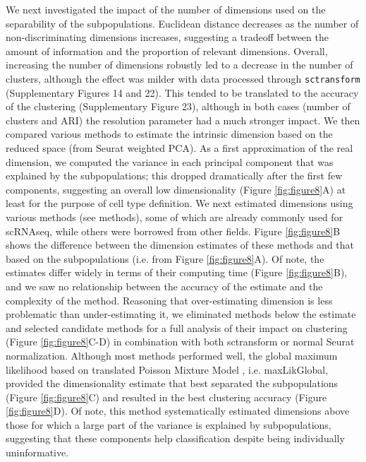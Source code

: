 \documentclass{bmcart}
\begin{document}
We next investigated the impact of the number of dimensions used on the separability of the subpopulations. Euclidean distance decreases as the number of non-discriminating dimensions increases, suggesting a tradeoff between the amount of information and the proportion of relevant dimensions. Overall, increasing the number of dimensions robustly led to a decrease in the number of clusters, although the effect was milder with data processed through \texttt{sctransform} (Supplementary Figures 14 and 22). This tended to be translated to the accuracy of the clustering (Supplementary Figure 23), although in both cases (number of clusters and ARI) the resolution parameter had a much stronger impact. We then compared various methods to estimate the intrinsic dimension based on the reduced space (from Seurat weighted PCA). As a first approximation of the real dimension, we computed the variance in each principal component that was explained by the subpopulations; this dropped dramatically after the first few components, suggesting an overall low dimensionality (Figure \ref{fig:figure8}A) at least for the purpose of cell type definition. We next estimated dimensions using various methods (see methods), some of which are already commonly used for scRNAseq, while others were borrowed from other fields. Figure \ref{fig:figure8}B shows the difference between the dimension estimates of these methods and that based on the subpopulations (i.e. from Figure \ref{fig:figure8}A). Of note, the estimates differ widely in terms of their computing time (Figure \ref{fig:figure8}B), and we saw no relationship between the accuracy of the estimate and the complexity of the method. Reasoning that over-estimating dimension is less problematic than under-estimating it, we eliminated methods below the estimate and selected candidate methods for a full analysis of their impact on clustering (Figure \ref{fig:figure8}C-D) in combination with both sctransform or normal Seurat normalization. Although most methods performed well, the global maximum likelihood based on translated Poisson Mixture Model \citep{haroTranslated2008}, i.e. maxLikGlobal, provided the dimensionality estimate that best separated the subpopulations (Figure \ref{fig:figure8}C) and resulted in the best clustering accuracy (Figure \ref{fig:figure8}D). Of note, this method systematically estimated dimensions above those for which a large part of the variance is explained by subpopulations, suggesting that these components help classification despite being individually uninformative.
\end{document}
